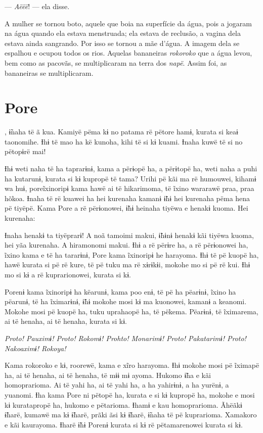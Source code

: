 --- \textit{Aëëë}! --- ela disse. 

A mulher se tornou boto, aquele que boia na superfície da água, pois a
jogaram na água quando ela estava menstruada; ela estava de reclusão, a
vagina dela estava ainda sangrando. Por isso se tornou a mãe d'água. 
A imagem dela se espalhou e ocupou todos os rios. Aquelas
bananeiras \textit{rokoroko} que a água levou, bem como as pacovãs, se
multiplicaram na terra dos \textit{napë}. Assim foi, as bananeiras se
multiplicaram. 

\chapter{Pore}
 
, ɨ̃naha të ã kua. Kamiyë pëma kɨ no patama rë pëtore hamɨ, kurata si
keaɨ taonomihe. Ɨhɨ të mao ha kë kunoha, kihi të si kɨ kuami. Ɨnaha kuwë
të si no pëtopɨrë mai! 

Ɨhɨ weti naha të ha taprarɨnɨ, kama a përɨopë ha, a përɨtopë ha, weti
naha a puhi ha kutarunɨ, kurata si kɨ kupropë të tama? Urihi pë kãi ma
rë humouwei, kihamɨ wa huɨ, poreĩxinoripɨ kama hawë ai të hikarimoma, të
ĩxino wararawë praa, praa hõkoa. Ɨnaha të rë kuawei ha hei kurenaha
kamanɨ ɨ̃hɨ hei kurenaha pëma hena pë tiyëpë. Kama Pore a rë përɨonowei,
ɨ̃hɨ heinaha tiyëwa e henakɨ kuoma. Hei kurenaha:

Ɨnaha henakɨ ta tiyëprarɨ! A noã tamoimi makui, ɨ̃hɨnɨ henakɨ kãi tiyëwa
kuoma, hei yãa kurenaha. A hiramonomi makui. Ɨhɨ a rë përɨre ha, a rë
përɨonowei ha, ĩxino kama e të ha tararɨnɨ, Pore kama ĩxinoripɨ he
harayoma. Ɨhɨ të pë kuopë ha, hawë kurata si pë rë kure, të pë tuku ma
rë xɨrɨkɨi, mokohe mo si pë rë kui. Ɨhɨ mo si kɨ a rë kuprarionowei,
kurata si kɨ. 

Porenɨ kama ĩxinoripɨ ha këarunɨ, kama poo enɨ, të pë ha pëarɨnɨ, ĩxino
ha pëarunɨ, të ha ĩximarɨnɨ, ɨ̃hɨ mokohe mosi kɨ ma kuonowei, kamanɨ a
keanomi. Mokohe mosi pë kuopë ha, tuku uprahaopë ha, të pëkema. Pëarɨnɨ,
të ĩximarema, ai të henaha, ai të henaha, kurata si kɨ.

\textit{Proto! Pauximɨ! Proto! Rokomɨ! Prohto! Monarimɨ! Proto! Pakatarimɨ!
Proto! Nakoaximɨ! Rokoya!} 

Kama rokoroko e kɨ, roorewë, kama e xĩro
harayoma. Ɨhɨ mokohe mosi pë ĩximapë ha, ai të henaha, ai të henaha, të
mɨɨ mɨ ayoma. Hukomo ɨ̃ha e kãi homoprarioma. Ai të yahi ha, ai të yahi
ha, a ha yahirɨnɨ, a ha yurënɨ, a yuanomi. Ɨha kama Pore ni pëtopë ha,
kurata e si kɨ kupropë ha, mokohe e mosi kɨ kuratapropë ha, hukomo e
pëtarioma. Ɨhamɨ e kau homoprarioma. Ãhëãkɨ ɨ̃harë, kumawë ma kɨ ɨ̃harë,
prãki ãsi kɨ ɨ̃harë, ɨ̃naha të pë kuprarioma. Xamakoro e kãi kaurayoma.
Ɨharë ɨ̃hɨ Porenɨ kurata si kɨ rë pëtamarenowei kurata si kɨ. 

